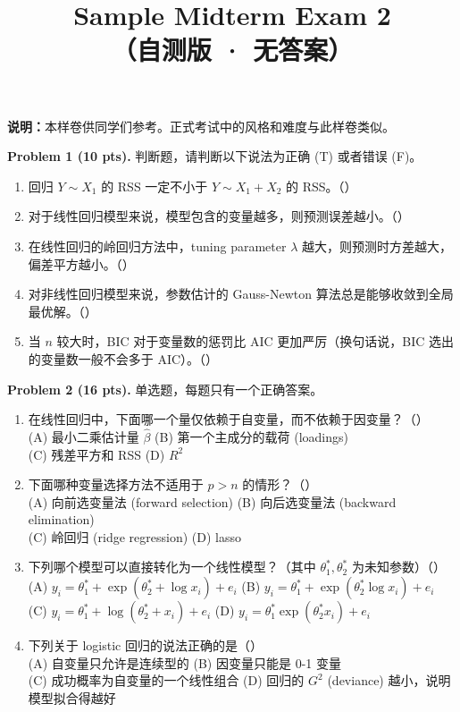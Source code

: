 \documentclass[11pt]{ctexart}
\title{\textbf{Sample Midterm Exam 2}\\[0.2em]
\large （自测版 · 无答案）}
\author{}
\date{}
\newcommand{\fillblank}{\mbox{（\qquad）}}
\begin{document}
\maketitle
\vspace{-1.2cm}

\noindent\textbf{说明：}本样卷供同学们参考。正式考试中的风格和难度与此样卷类似。

\vspace{0.6em}

\noindent\textbf{Problem 1 (10 pts).} 判断题，请判断以下说法为正确 (T) 或者错误 (F)。
\begin{enumerate}
\item 回归 $Y \sim X_1$ 的 RSS 一定不小于 $Y \sim X_1 + X_2$ 的 RSS。\fillblank
\item 对于线性回归模型来说，模型包含的变量越多，则预测误差越小。\fillblank
\item 在线性回归的岭回归方法中，tuning parameter $\lambda$ 越大，则预测时方差越大，偏差平方越小。\fillblank
\item 对非线性回归模型来说，参数估计的 Gauss-Newton 算法总是能够收敛到全局最优解。\fillblank
\item 当 $n$ 较大时，BIC 对于变量数的惩罚比 AIC 更加严厉（换句话说，BIC 选出的变量数一般不会多于 AIC）。\fillblank
\end{enumerate}

\noindent\textbf{Problem 2 (16 pts).} 单选题，每题只有一个正确答案。
\begin{enumerate}
\item 在线性回归中，下面哪一个量仅依赖于自变量，而不依赖于因变量？\fillblank\\
(A) 最小二乘估计量 $\hat{\beta}$\quad
(B) 第一个主成分的载荷 (loadings)\\
(C) 残差平方和 RSS\quad
(D) $R^2$
\item 下面哪种变量选择方法不适用于 $p > n$ 的情形？\fillblank\\
(A) 向前选变量法 (forward selection)\quad
(B) 向后选变量法 (backward elimination)\\
(C) 岭回归 (ridge regression)\quad
(D) lasso
\item 下列哪个模型可以直接转化为一个线性模型？（其中 $\theta_1^*, \theta_2^*$ 为未知参数）\fillblank\\
(A) $y_i = \theta_1^* + \exp(\theta_2^* + \log x_i) + e_i$\quad
(B) $y_i = \theta_1^* + \exp(\theta_2^* \log x_i) + e_i$\\
(C) $y_i = \theta_1^* + \log(\theta_2^* + x_i) + e_i$\quad
(D) $y_i = \theta_1^* \exp(\theta_2^* x_i) + e_i$
\item 下列关于 logistic 回归的说法正确的是\fillblank\\
(A) 自变量只允许是连续型的\quad
(B) 因变量只能是 0-1 变量\\
(C) 成功概率为自变量的一个线性组合\quad
(D) 回归的 $G^2$ (deviance) 越小，说明模型拟合得越好
\end{enumerate}
\end{document}
